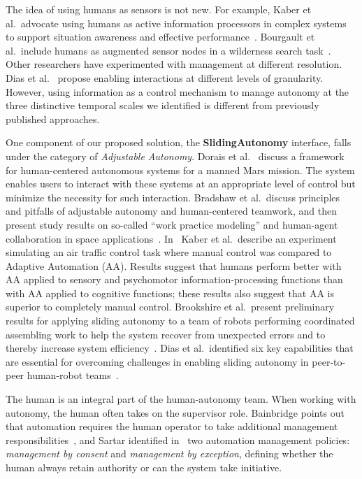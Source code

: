 The idea of using humans as sensors is not new. For example, Kaber et al.\ advocate using humans as active information processors in complex systems to support situation awareness and effective performance~\cite{Kaber2001Design}. Bourgault et al.\ include humans as augmented sensor nodes in a wilderness search task~\cite{Bourgault2008Human}. Other researchers have experimented with management at different resolution. Dias et al.\ \cite{Dias2008SlidingAutonomy} propose enabling interactions at different levels of granularity. However, using information as a control mechanism to manage autonomy at the three distinctive temporal scales we identified is different from previously published approaches.

One component of our proposed solution, the \textbf{SlidingAutonomy} interface, falls under the category of \textit{Adjustable Autonomy}. Dorais et al.\ \cite{Dorais1998AdjustableAutonomy} discuss a framework for human-centered autonomous systems for a manned Mars mission. The system enables users to interact with these systems at an appropriate level of control but minimize the necessity for such interaction. Bradshaw et al.\ discuss principles and pitfalls of adjustable autonomy and human-centered teamwork, and then present study results on so-called ``work practice modeling'' and human-agent collaboration in space applications~\cite{Bradshaw2003AdjustableAutonomy}. In~\cite{Kaber2005Adaptive} Kaber et al.\ describe an experiment simulating an air traffic control task where manual control was compared to Adaptive Automation (AA). Results suggest that humans perform better with AA applied to sensory and psychomotor information-processing functions than with AA applied to cognitive functions; these results also suggest that AA is superior to completely manual control. Brookshire et al.\ present preliminary results for applying sliding autonomy to a team of robots performing coordinated assembling work to help the system recover from unexpected errors and to thereby increase system efficiency~\cite{Brookshire2004Preliminary}. Dias et al.\ identified six key capabilities that are essential for overcoming challenges in enabling sliding autonomy in peer-to-peer human-robot teams~\cite{Dias2008SlidingAutonomy}.

The human is an integral part of the human-autonomy team. When working with autonomy, the human often takes on the supervisor role. Bainbridge points out that automation requires the human operator to take additional management responsibilities~\cite{Bainbridge1983Ironies}, and Sartar identified in~\cite{Sarter1998Making} two automation management policies: \textit{management by consent} and \textit{management by exception}, defining whether the human always retain authority or can the system take initiative. 

